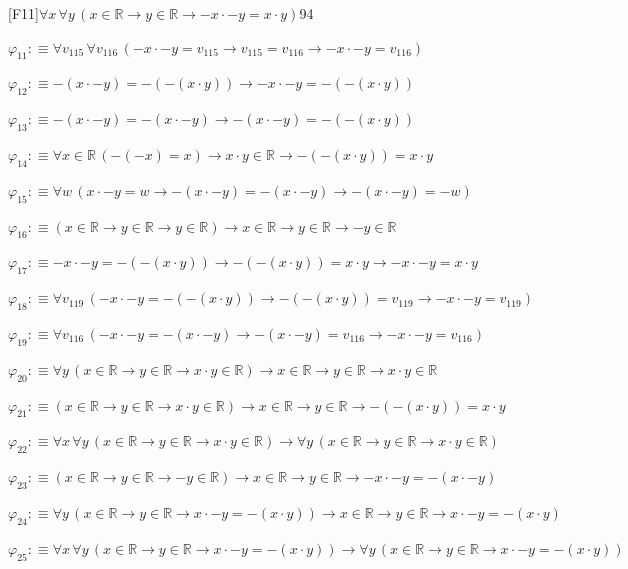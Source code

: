 \begin{fullproof}{[F11]}{$\forall x\,\forall y\,(x \in \mathbb{R} \to y \in \mathbb{R} \to -x \cdot -y = x \cdot y)$}{94}
\begin{abbrevlist}
\item $\varphi_{11} :\equiv \forall v_{115}\,\forall v_{116}\,(-x \cdot -y = v_{115} \to v_{115} = v_{116} \to -x \cdot -y = v_{116})$
\item $\varphi_{12} :\equiv -(x \cdot -y) = -(-(x \cdot y)) \to -x \cdot -y = -(-(x \cdot y))$
\item $\varphi_{13} :\equiv -(x \cdot -y) = -(x \cdot -y) \to -(x \cdot -y) = -(-(x \cdot y))$
\item $\varphi_{14} :\equiv \forall x \in \mathbb{R}\,(-(-x) = x) \to x \cdot y \in \mathbb{R} \to -(-(x \cdot y)) = x \cdot y$
\item $\varphi_{15} :\equiv \forall w\,(x \cdot -y = w \to -(x \cdot -y) = -(x \cdot -y) \to -(x \cdot -y) = -w)$
\item $\varphi_{16} :\equiv (x \in \mathbb{R} \to y \in \mathbb{R} \to y \in \mathbb{R}) \to x \in \mathbb{R} \to y \in \mathbb{R} \to -y \in \mathbb{R}$
\item $\varphi_{17} :\equiv -x \cdot -y = -(-(x \cdot y)) \to -(-(x \cdot y)) = x \cdot y \to -x \cdot -y = x \cdot y$
\item $\varphi_{18} :\equiv \forall v_{119}\,(-x \cdot -y = -(-(x \cdot y)) \to -(-(x \cdot y)) = v_{119} \to -x \cdot -y = v_{119})$
\item $\varphi_{19} :\equiv \forall v_{116}\,(-x \cdot -y = -(x \cdot -y) \to -(x \cdot -y) = v_{116} \to -x \cdot -y = v_{116})$
\item $\varphi_{20} :\equiv \forall y\,(x \in \mathbb{R} \to y \in \mathbb{R} \to x \cdot y \in \mathbb{R}) \to x \in \mathbb{R} \to y \in \mathbb{R} \to x \cdot y \in \mathbb{R}$
\item $\varphi_{21} :\equiv (x \in \mathbb{R} \to y \in \mathbb{R} \to x \cdot y \in \mathbb{R}) \to x \in \mathbb{R} \to y \in \mathbb{R} \to -(-(x \cdot y)) = x \cdot y$
\item $\varphi_{22} :\equiv \forall x\,\forall y\,(x \in \mathbb{R} \to y \in \mathbb{R} \to x \cdot y \in \mathbb{R}) \to \forall y\,(x \in \mathbb{R} \to y \in \mathbb{R} \to x \cdot y \in \mathbb{R})$
\item $\varphi_{23} :\equiv (x \in \mathbb{R} \to y \in \mathbb{R} \to -y \in \mathbb{R}) \to x \in \mathbb{R} \to y \in \mathbb{R} \to -x \cdot -y = -(x \cdot -y)$
\item $\varphi_{24} :\equiv \forall y\,(x \in \mathbb{R} \to y \in \mathbb{R} \to x \cdot -y = -(x \cdot y)) \to x \in \mathbb{R} \to y \in \mathbb{R} \to x \cdot -y = -(x \cdot y)$
\item $\varphi_{25} :\equiv \forall x\,\forall y\,(x \in \mathbb{R} \to y \in \mathbb{R} \to x \cdot -y = -(x \cdot y)) \to \forall y\,(x \in \mathbb{R} \to y \in \mathbb{R} \to x \cdot -y = -(x \cdot y))$

\end{abbrevlist}
\end{fullproof}

